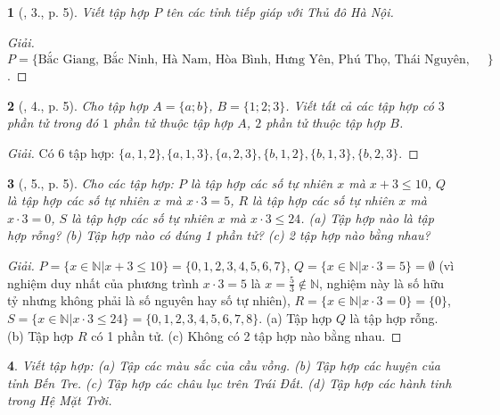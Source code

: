 \documentclass{article}
\newtheorem{baitoan}{}
\begin{document}
\begin{baitoan}[\cite{Tuyen_Toan_6}, 3., p. 5]
	Viết tập hợp $P$ tên các tỉnh tiếp giáp với Thủ đô Hà Nội.
\end{baitoan}

\begin{proof}[Giải]
	$P = \{\mbox{Bắc Giang, Bắc Ninh, Hà Nam, Hòa Bình, Hưng Yên, Phú Thọ, Thái Nguyên, Vĩnh Phúc}\}$.
\end{proof}

\begin{baitoan}[\cite{Tuyen_Toan_6}, 4., p. 5]
	Cho tập hợp $A = \{a;b\}$, $B = \{1;2;3\}$. Viết tất cả các tập hợp có $3$ phần tử trong đó $1$ phần tử thuộc tập hợp $A$, $2$ phần tử thuộc tập hợp $B$.
\end{baitoan}

\begin{proof}[Giải]
	Có 6 tập hợp: $\{a,1,2\},\{a,1,3\},\{a,2,3\},\{b,1,2\},\{b,1,3\},\{b,2,3\}$.
\end{proof}

\begin{baitoan}[\cite{Tuyen_Toan_6}, 5., p. 5]
	Cho các tập hợp: $P$ là tập hợp các số tự nhiên $x$ mà $x + 3\le10$, $Q$ là tập hợp các số tự nhiên $x$ mà $x\cdot3 = 5$, $R$ là tập hợp các số tự nhiên $x$ mà $x\cdot3 = 0$, $S$ là tập hợp các số tự nhiên $x$ mà $x\cdot3\le24$. (a) Tập hợp nào là tập hợp rỗng? (b) Tập hợp nào có đúng 1 phần tử? (c) 2 tập hợp nào bằng nhau?
\end{baitoan}

\begin{proof}[Giải]
	$P = \{x\in\mathbb{N}|x + 3\le10\} = \{0,1,2,3,4,5,6,7\}$, $Q = \{x\in\mathbb{N}|x\cdot3 = 5\} = \emptyset$ (vì nghiệm duy nhất của phương trình $x\cdot3 = 5$ là $x = \frac{5}{3}\notin\mathbb{N}$, nghiệm này là số hữu tỷ nhưng không phải là số nguyên hay số tự nhiên), $R = \{x\in\mathbb{N}|x\cdot3 = 0\} = \{0\}$, $S = \{x\in\mathbb{N}|x\cdot3\le24\} = \{0,1,2,3,4,5,6,7,8\}$. (a) Tập hợp $Q$ là tập hợp rỗng. (b) Tập hợp $R$ có 1 phần tử. (c) Không có 2 tập hợp nào bằng nhau.
\end{proof}

\begin{baitoan}
	Viết tập hợp: (a) Tập các màu sắc của cầu vồng. (b) Tập hợp các huyện của tỉnh Bến Tre. (c) Tập hợp các châu lục trên Trái Đất. (d) Tập hợp các hành tinh trong Hệ Mặt Trời.
\end{baitoan}
\end{document}
